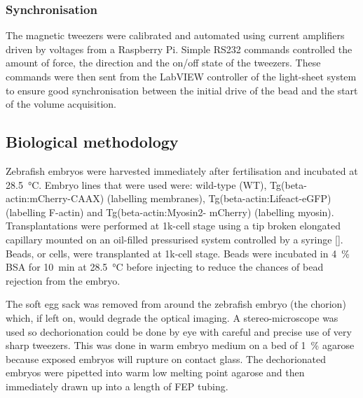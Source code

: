 \subsubsection{Synchronisation}

The magnetic tweezers were calibrated and automated using current amplifiers driven by voltages from a Raspberry Pi.
Simple \gls{RS232} commands controlled the amount of force, the direction and the on/off state of the tweezers.
These commands were then sent from the \gls{LabVIEW} controller of the \gls{light-sheet} system to ensure good synchronisation between the initial drive of the bead and the start of the volume acquisition.
%

\subsection{Biological methodology}

Zebrafish embryos were harvested immediately after fertilisation and incubated at \SI{28.5}{\celsius}.
Embryo lines that were used were: wild-type (WT), Tg(beta-actin:mCherry-CAAX) (labelling membranes), Tg(beta-actin:Lifeact-eGFP) (labelling F-actin) and Tg(beta-actin:Myosin2- mCherry) (labelling myosin).
Transplantations were performed at 1k-cell stage using a tip broken elongated capillary \cite{} mounted on an oil-filled pressurised system controlled by a syringe []. Beads, or cells, were transplanted at 1k-cell stage.
Beads were incubated in \SI{4}{\percent} BSA for \SI{10}{\minute} at \SI{28.5}{\celsius} before injecting to reduce the chances of bead rejection from the embryo.

The soft egg sack was removed from around the \gls{zebrafish} embryo (the chorion) which, if left on, would degrade the optical imaging.
A stereo-microscope was used so dechorionation could be done by eye with careful and precise use of very sharp tweezers.
This was done in warm embryo medium on a bed of \SI{1}{\percent} agarose because exposed embryos will rupture on contact glass.
The dechorionated embryos were pipetted into warm low melting point agarose and then immediately drawn up into a length of \gls{FEP} tubing.

